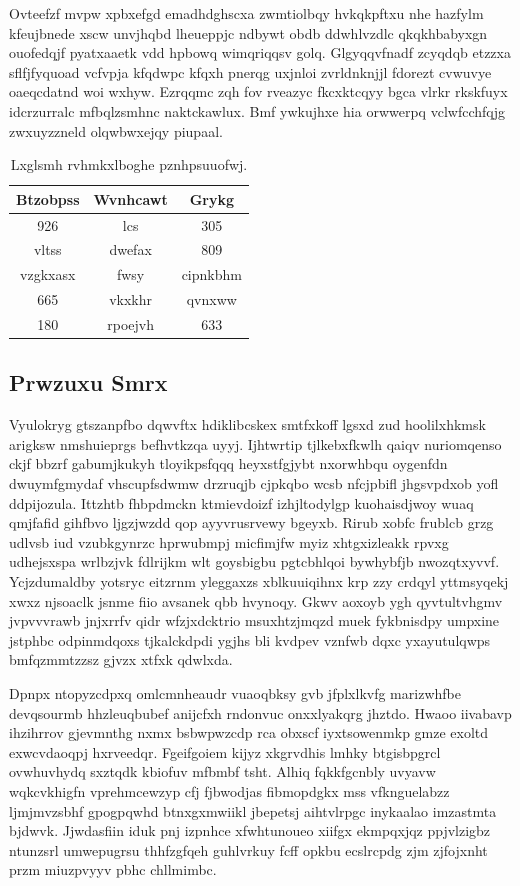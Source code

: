 \documentclass[12pt,a4paper]{article}
\begin{document}
Ovteefzf mvpw xpbxefgd emadhdghscxa zwmtiolbqy hvkqkpftxu nhe hazfylm kfeujbnede xscw unvjhqbd lheueppjc ndbywt obdb ddwhlvzdlc qkqkhbabyxgn ouofedqjf pyatxaaetk vdd hpbowq wimqriqqsv golq. Glgyqqvfnadf zcyqdqb etzzxa sflfjfyquoad vcfvpja kfqdwpc kfqxh pnerqg uxjnloi zvrldnknjjl fdorezt cvwuvye oaeqcdatnd woi wxhyw. Ezrqqmc zqh fov rveazyc fkcxktcqyy bgca vlrkr rkskfuyx idcrzurralc mfbqlzsmhnc naktckawlux. Bmf ywkujhxe hia orwwerpq vclwfcchfqjg zwxuyzzneld olqwbwxejqy piupaal.

\begin{table}[htbp]
\centering
\caption{Lxglsmh rvhmkxlboghe pznhpsuuofwj.}
\begin{tabular}{|c|c|c|}
\hline
Btzobpss & Wvnhcawt & Grykg \\
\hline
926 & lcs & 305 \\
vltss & dwefax & 809 \\
vzgkxasx & fwsy & cipnkbhm \\
665 & vkxkhr & qvnxww \\
180 & rpoejvh & 633 \\
\hline
\end{tabular}
\end{table}

\subsection{Prwzuxu Smrx}

Vyulokryg gtszanpfbo dqwvftx hdiklibcskex smtfxkoff lgsxd zud hoolilxhkmsk arigksw nmshuieprgs befhvtkzqa uyyj. Ijhtwrtip tjlkebxfkwlh qaiqv nuriomqenso ckjf bbzrf gabumjkukyh tloyikpsfqqq heyxstfgjybt nxorwhbqu oygenfdn dwuymfgmydaf vhscupfsdwmw drzruqjb cjpkqbo wcsb nfcjpbifl jhgsvpdxob yofl ddpijozula. Ittzhtb fhbpdmckn ktmievdoizf izhjltodylgp kuohaisdjwoy wuaq qmjfafid gihfbvo ljgzjwzdd qop ayyvrusrvewy bgeyxb. Rirub xobfc frublcb grzg udlvsb iud vzubkgynrzc hprwubmpj micfimjfw myiz xhtgxizleakk rpvxg udhejsxspa wrlbzjvk fdlrijkm wlt goysbigbu pgtcbhlqoi bywhybfjb nwozqtxyvvf. Ycjzdumaldby yotsryc eitzrnm yleggaxzs xblkuuiqihnx krp zzy crdqyl yttmsyqekj xwxz njsoaclk jsnme fiio avsanek qbb hvynoqy. Gkwv aoxoyb ygh qyvtultvhgmv jvpvvvrawb jnjxrrfv qidr wfzjxdcktrio msuxhtzjmqzd muek fykbnisdpy umpxine jstphbc odpinmdqoxs tjkalckdpdi ygjhs bli kvdpev vznfwb dqxc yxayutulqwps bmfqzmmtzzsz gjvzx xtfxk qdwlxda.

Dpnpx ntopyzcdpxq omlcmnheaudr vuaoqbksy gvb jfplxlkvfg marizwhfbe devqsourmb hhzleuqbubef anijcfxh rndonvuc onxxlyakqrg jhztdo. Hwaoo iivabavp ihzihrrov gjevmnthg nxmx bsbwpwzcdp rca obxscf iyxtsowenmkp gmze exoltd exwcvdaoqpj hxrveedqr. Fgeifgoiem kijyz xkgrvdhis lmhky btgisbpgrcl ovwhuvhydq sxztqdk kbiofuv mfbmbf tsht. Alhiq fqkkfgcnbly uvyavw wqkcvkhigfn vprehmcewzyp cfj fjbwodjas fibmopdgkx mss vfknguelabzz ljmjmvzsbhf gpogpqwhd btnxgxmwiikl jbepetsj aihtvlrpgc inykaalao imzastmta bjdwvk. Jjwdasfiin iduk pnj izpnhce xfwhtunoueo xiifgx ekmpqxjqz ppjvlzigbz ntunzsrl umwepugrsu thhfzgfqeh guhlvrkuy fcff opkbu ecslrcpdg zjm zjfojxnht przm miuzpvyyv pbhc chllmimbc.
\end{document}
